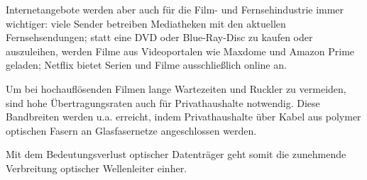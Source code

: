 Internetangebote werden aber auch für die Film- und Fernsehindustrie immer
wichtiger: viele Sender betreiben Mediatheken mit den aktuellen
Fernsehsendungen; statt eine DVD oder Blue-Ray-Disc zu kaufen oder auszuleihen,
werden Filme aus Videoportalen wie Maxdome und Amazon Prime geladen; Netflix
bietet Serien und Filme ausschließlich online an.

Um bei hochauflösenden Filmen lange Wartezeiten und \glqq Ruckler\grqq{} zu
vermeiden, sind hohe Übertragungsraten auch für Privathaushalte notwendig. Diese
Bandbreiten werden u.a. erreicht, indem Privathaushalte über Kabel aus polymer
optischen Fasern an Glasfasernetze angeschlossen werden.

Mit dem Bedeutungsverlust optischer Datenträger geht somit die zunehmende
Verbreitung optischer Wellenleiter einher.
